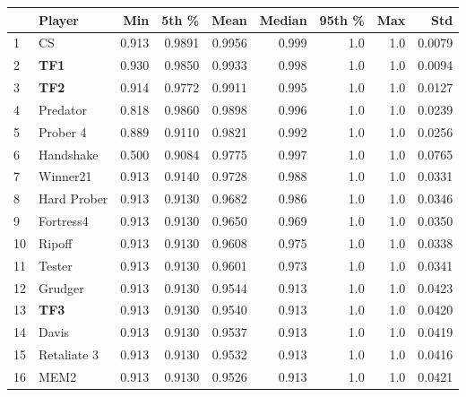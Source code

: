 \begin{tabular}{llrrrrrrr}
\toprule
{} &       Player &    Min &   5th \% &    Mean &  Median &  95th \% &  Max &     Std \\
\midrule
1  &           CS &  0.913 &  0.9891 &  0.9956 &   0.999 &     1.0 &  1.0 &  0.0079 \\
2  &          \textbf{TF1} &  0.930 &  0.9850 &  0.9933 &   0.998 &     1.0 &  1.0 &  0.0094 \\
3  &          \textbf{TF2} &  0.914 &  0.9772 &  0.9911 &   0.995 &     1.0 &  1.0 &  0.0127 \\
4  &     Predator &  0.818 &  0.9860 &  0.9898 &   0.996 &     1.0 &  1.0 &  0.0239 \\
5  &     Prober 4 &  0.889 &  0.9110 &  0.9821 &   0.992 &     1.0 &  1.0 &  0.0256 \\
6  &    Handshake &  0.500 &  0.9084 &  0.9775 &   0.997 &     1.0 &  1.0 &  0.0765 \\
7  &     Winner21 &  0.913 &  0.9140 &  0.9728 &   0.988 &     1.0 &  1.0 &  0.0331 \\
8  &  Hard Prober &  0.913 &  0.9130 &  0.9682 &   0.986 &     1.0 &  1.0 &  0.0346 \\
9  &    Fortress4 &  0.913 &  0.9130 &  0.9650 &   0.969 &     1.0 &  1.0 &  0.0350 \\
10 &       Ripoff &  0.913 &  0.9130 &  0.9608 &   0.975 &     1.0 &  1.0 &  0.0338 \\
11 &       Tester &  0.913 &  0.9130 &  0.9601 &   0.973 &     1.0 &  1.0 &  0.0341 \\
12 &      Grudger &  0.913 &  0.9130 &  0.9544 &   0.913 &     1.0 &  1.0 &  0.0423 \\
13 &          \textbf{TF3} &  0.913 &  0.9130 &  0.9540 &   0.913 &     1.0 &  1.0 &  0.0420 \\
14 &        Davis &  0.913 &  0.9130 &  0.9537 &   0.913 &     1.0 &  1.0 &  0.0419 \\
15 &  Retaliate 3 &  0.913 &  0.9130 &  0.9532 &   0.913 &     1.0 &  1.0 &  0.0416 \\
16 &         MEM2 &  0.913 &  0.9130 &  0.9526 &   0.913 &     1.0 &  1.0 &  0.0421 \\
\bottomrule
\end{tabular}
